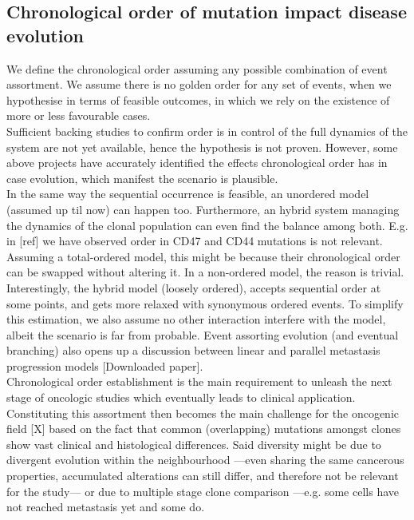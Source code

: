 \subsection{Chronological order of mutation impact disease evolution}
We define the chronological order assuming any possible combination of event assortment. We assume there is no golden order for any set of events, when we hypothesise in terms of feasible outcomes, in which we rely on the existence of more or less favourable cases.
\\

Sufficient backing studies to confirm order is in control of the full dynamics of the system are not yet available, hence the hypothesis is not proven. However, some above projects have accurately identified the effects chronological order has in case evolution, which manifest the scenario is plausible. 
\\

In the same way the sequential occurrence is feasible, an unordered model (assumed up til now) can happen too. Furthermore, an hybrid system managing the dynamics of the clonal population can even find the balance among both. E.g. in [ref] we have observed order in CD47 and CD44 mutations is not relevant. Assuming a total-ordered model, this might be because their chronological order can be swapped without altering it. In a non-ordered model, the reason is trivial. Interestingly, the hybrid model (loosely ordered), accepts sequential order at some points, and gets more relaxed with synonymous ordered events. To simplify this estimation, we also assume no other interaction interfere with the model, albeit the scenario is far from probable. Event assorting evolution (and eventual branching) also opens up a discussion between linear and parallel metastasis progression models [Downloaded paper].
\\

Chronological order establishment is the main requirement to unleash the next stage  of oncologic studies which eventually leads to clinical application. Constituting this assortment then becomes the main challenge for the oncogenic field [X] based on the fact that common (overlapping) mutations amongst clones show vast clinical and histological differences. Said diversity might be due to divergent evolution within the neighbourhood —even sharing the same cancerous properties, accumulated alterations can still differ, and therefore not be relevant for the study— or due to multiple stage clone comparison —e.g. some cells have not reached metastasis yet and some do.
\\

